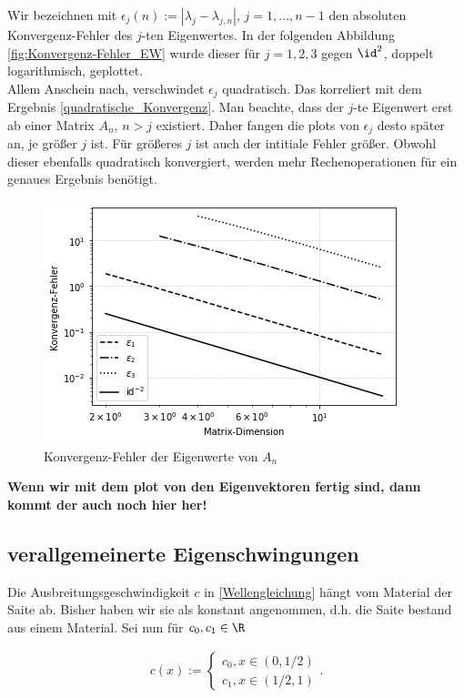 Wir bezeichnen mit $\epsilon_j(n) := |\lambda_j - \lambda_{j, n}|$, $j = 1, \ldots, n-1$ den absoluten Konvergenz-Fehler des $j$-ten Eigenwertes. In der folgenden Abbildung \ref{fig:Konvergenz-Fehler_EW} wurde dieser für $j = 1, 2, 3$ gegen $\id^2$, doppelt logarithmisch, geplottet. \\

Allem Anschein nach, verschwindet $\epsilon_j$ quadratisch. Das korreliert mit dem Ergebnis \eqref{quadratische_Konvergenz}. Man beachte, dass der $j$-te Eigenwert erst ab einer Matrix $A_n$, $n > j$ existiert. Daher fangen die plots von $\epsilon_j$ desto später an, je größer $j$ ist. Für größeres $j$ ist auch der intitiale Fehler größer. Obwohl dieser ebenfalls quadratisch konvergiert, werden mehr Rechenoperationen für ein genaues Ergebnis benötigt. \\

\begin{figure}[h!]
  \centering
  \includegraphics[width = 0.5 \textwidth]{Aufgabe_2/Konvergenz-Fehler_der_Eigenwerte_von_A_n}
  \caption{Konvergenz-Fehler der Eigenwerte von $A_n$}
  \label{Konvergenz-Fehler_EW}
\end{figure}

\textbf{Wenn wir mit dem plot von den Eigenvektoren fertig sind, dann kommt der auch noch hier her!}

\subsection{verallgemeinerte Eigenschwingungen}

Die Ausbreitungsgeschwindigkeit $c$ in \eqref{Wellengleichung} hängt vom Material der Saite ab. Bisher haben wir sie als konstant angenommen, d.h. die Saite bestand aus einem Material. Sei nun für $c_0, c_1 \in \R$

\begin{align} \label{Material-Funktion}
  c(x) :=
  \begin{cases}
    c_0, x \in (0, 1/2) \\
    c_1, x \in (1/2, 1)
  \end{cases}.
\end{align}

